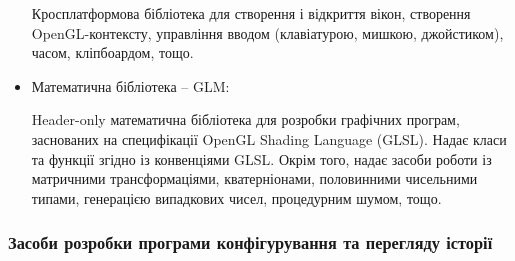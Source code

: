 \begin{itemize}[label=\Large$\diamond$]
    Кросплатформова бібліотека для створення і відкриття вікон, створення OpenGL-контексту, управління вводом (клавіатурою, мишкою, джойстиком), часом, кліпбоардом, тощо.

  \item Математична бібліотека -- GLM:

    Header-only математична бібліотека для розробки графічних програм, заснованих на специфікації OpenGL Shading Language (GLSL). Надає класи та функції згідно із конвенціями GLSL. Окрім того, надає засоби роботи із матричними трансформаціями, кватерніонами, половинними чисельними типами, генерацією випадкових чисел, процедурним шумом, тощо.

\end{itemize}

\subsubsection{Засоби розробки програми конфігурування та перегляду історії}
